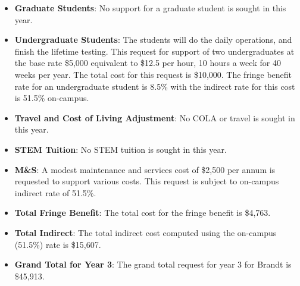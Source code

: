 \begin{enumerate}
\begin{itemize}[noitemsep,nolistsep]
\item{{\bf Graduate Students}: No support for a graduate student is sought in this year.}

\item {{\bf Undergraduate Students}: The students will do the daily operations, and finish the lifetime testing. This request for support of two undergraduates at the base rate \$5,000 equivalent to \$12.5 per hour, 10 hours a week for 40 weeks per year.  The total cost for this request is \$10,000.  The fringe benefit rate for an undergraduate student is 8.5\% with the indirect rate for this cost is 51.5\% on-campus.}

\item{{\bf Travel and Cost of Living Adjustment}: No COLA or travel is sought in this year.}  


\item {{\bf STEM Tuition}: No STEM tuition is sought in this year.}

\item {{\bf M\&S}: A modest maintenance and services cost of \$2,500 per annum is requested to support various costs.   This request is subject to on-campus indirect rate of 51.5\%.}

\item {{\bf Total Fringe Benefit}: The total cost for the fringe benefit is \$4,763.}

\item {{\bf Total Indirect}: The total indirect cost computed using the on-campus (51.5\%) rate is \$15,607.}

\item {{\bf Grand Total for Year 3}: The grand total request for year 3 for Brandt is \$45,913.}

\end{itemize}

\end{enumerate}

\newpage

